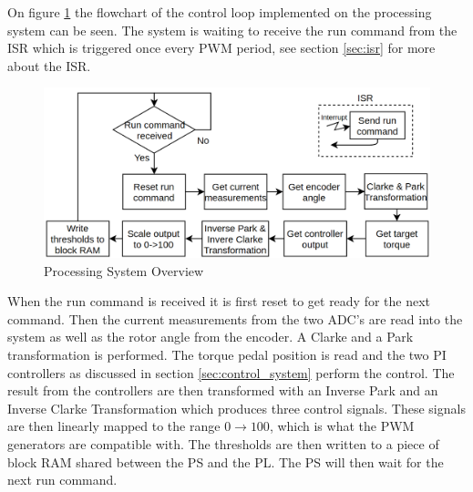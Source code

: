 On figure \ref{fig:software_flow} the flowchart of the control loop implemented on the processing system can be seen. The system is waiting to receive the run command from the ISR which is triggered once every PWM period, see section \ref{sec:isr} for more about the ISR. 


\begin{figure}[H]
	\centering
	\includegraphics[width=0.9\linewidth]{pictures/software/software_flow.png}
	\caption{Processing System Overview}
	\label{fig:software_flow}
\end{figure}

When the run command is received it is first reset to get ready for the next command. Then the current measurements from the two ADC's are read into the system as well as the rotor angle from the encoder. A Clarke and a Park transformation is performed. The torque pedal position is read and the two PI controllers as discussed in section \ref{sec:control_system} perform the control. The result from the controllers are then transformed with an Inverse Park and an Inverse Clarke Transformation which produces three control signals. These signals are then linearly mapped to the range $0 \rightarrow 100$, which is what the PWM generators are compatible with. 
The thresholds are then written to a piece of block RAM shared between the PS and the PL. The PS will then wait for the next run command.




